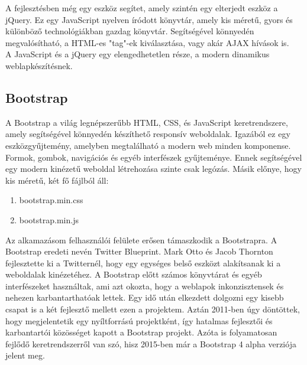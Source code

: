 A fejlesztésben még egy eszköz segítet, amely szintén egy elterjedt eszköz a jQuery. Ez egy JavaScript nyelven íródott könyvtár, amely kis méretű, gyors és különböző technológiákban gazdag könyvtár. Segítségével könnyedén megvalósítható, a HTML-es "tag"-ek kiválasztása, vagy akár AJAX hívások is. \\
A JavaScript és a jQuery egy elengedhetetlen része, a modern dinamikus weblapkészítésnek.


\subsection{Bootstrap}
A Bootstrap a világ legnépszerűbb HTML, CSS, és JavaScript keretrendszere, amely segítségével könnyedén készíthető responsív weboldalak. Igazából ez egy eszközgyűjtemény, amelyben megtalálható a modern web minden komponense. Formok, gombok, navigációs és egyéb interfészek gyűjteménye. Ennek segítségével egy modern kinézetű weboldal létrehozása szinte csak legózás. Másik előnye, hogy kis méretű, két fő fájlból áll: 
\begin{enumerate}
    \item bootstrap.min.css
    \item bootstrap.min.js
\end{enumerate}

Az alkamazásom felhasználói felülete erősen támaszkodik a Bootstrapra.
A Bootstrap eredeti nevén Twitter Blueprint. Mark Otto és Jacob Thornton fejlesztette ki a Twitternél, hogy egy egységes belső eszközt alakítsanak ki a weboldalak kinézetéhez. A Bootstrap előtt számos könyvtárat és egyéb interfészeket használtak, ami azt okozta, hogy a weblapok inkonzisztensek és nehezen karbantarthatóak lettek. Egy idő után elkezdett dolgozni egy kisebb csapat is a két fejlesztő mellett ezen a projektem. Aztán 2011-ben úgy döntöttek, hogy megjelentetik egy nyíltforrású projektként, így hatalmas fejlesztői és karbantartói közösséget kapott a Bootstrap projekt. Azóta is folyamatosan fejlődő keretrendszerről van szó, hisz 2015-ben már a Bootstrap 4 alpha verziója jelent meg.


